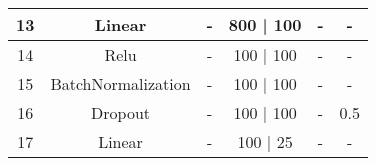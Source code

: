 \documentclass[11pt]{article}
\begin{document}
\begin{table}[H]
\begin{tabular}{|c|c|c|c|c|c|}
13        & Linear             & -                                                                 & 800 | 100                                                          & -                                                                               & -                                                                     \\ \hline
14        & Relu               & -                                                                 & 100 | 100                                                          & -                                                                               & -                                                                     \\ \hline
15        & BatchNormalization & -                                                                 & 100 | 100                                                          & -                                                                               & -                                                                     \\ \hline
16        & Dropout            & -                                                                 & 100 | 100                                                          & -                                                                               & 0.5                                                                   \\ \hline
17        & Linear             & -                                                                 & 100 | 25                                                           & -                                                                               & -                                                                     \\ \hline
\end{tabular}
\end{table}
\end{document}

